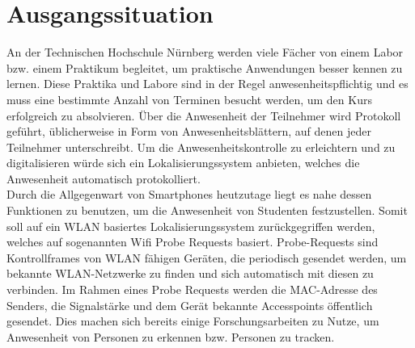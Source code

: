 \section{Ausgangssituation}

An der Technischen Hochschule Nürnberg werden viele Fächer von einem Labor bzw. einem Praktikum begleitet, um praktische Anwendungen besser kennen zu lernen.
Diese Praktika und Labore sind in der Regel anwesenheitspflichtig und es muss eine bestimmte Anzahl von Terminen besucht werden, um den Kurs erfolgreich zu absolvieren.
Über die Anwesenheit der Teilnehmer wird Protokoll geführt, üblicherweise in Form von Anwesenheitsblättern, auf denen jeder Teilnehmer unterschreibt.
Um die Anwesenheitskontrolle zu erleichtern und zu digitalisieren würde sich ein Lokalisierungssystem anbieten, welches die Anwesenheit automatisch protokolliert.
\\

Durch die Allgegenwart von Smartphones heutzutage liegt es nahe dessen Funktionen zu benutzen, um die Anwesenheit von Studenten festzustellen.
Somit soll auf ein WLAN basiertes Lokalisierungssystem zurückgegriffen werden, welches auf sogenannten Wifi Probe Requests basiert.
Probe-Requests sind Kontrollframes von WLAN fähigen Geräten, die periodisch gesendet werden, um bekannte WLAN-Netzwerke zu finden und sich automatisch mit diesen zu verbinden. \cite{wifiproberequests2019}
Im Rahmen eines Probe Requests werden die MAC-Adresse des Senders, die Signalstärke und dem Gerät bekannte Accesspoints öffentlich gesendet.
Dies machen sich bereits einige Forschungsarbeiten zu Nutze, um Anwesenheit von Personen zu erkennen bzw. Personen zu tracken. \cite{sail2014,sherlock2018}